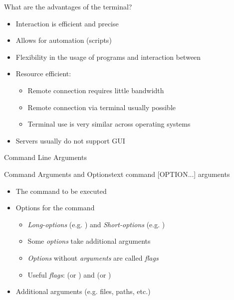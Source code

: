 \documentclass{setbeamer}
\begin{document}
\begin{frame}{What are the advantages of the terminal?}
    \begin{itemize}
        \item Interaction is efficient and precise
        \item Allows for automation (scripts)
        \item Flexibility in the usage of programs and interaction between
        \item Resource efficient:
        \begin{itemize}
            \item Remote connection requires little bandwidth
            \item Remote connection via terminal usually possible
            \item Terminal use is very similar across operating systems
        \end{itemize}
        \item Servers usually do not support GUI
    \end{itemize}
\end{frame}




\begin{frame}[fragile]{Command Line Arguments}
    \begin{TUMCodeBlock}{Command Arguments and Options}{text}
        command [OPTION...] arguments
    \end{TUMCodeBlock}

    \vspace{0.3cm}

    \begin{itemize}
        \item {}\textemdash The command to be executed

        \item {}\textemdash Options for the command
        \begin{itemize}
            \item \emph{Long-options} (e.g. ) and \emph{Short-options} (e.g. )
            \item Some \emph{options} take additional arguments
            \item \emph{Options} without \emph{arguments} are called \emph{flags}
            \item Useful \emph{flags}:  (or ) and  (or )
        \end{itemize}

        \item {}\textemdash Additional arguments (e.g. files, paths, etc.)
    \end{itemize}

   
\end{frame}
\end{document}

